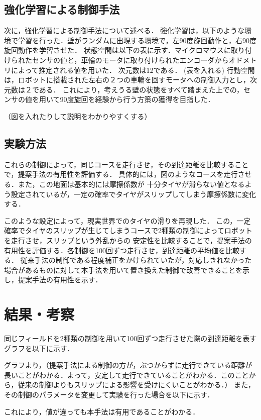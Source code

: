 \documentclass[a4paper,11pt]{jsarticle}
\begin{document}
\subsection{強化学習による制御手法}
次に，強化学習による制御手法について述べる．
強化学習は，以下のような環境で学習を行った．壁がランダムに出現する環境で，左90度旋回動作と，右90度旋回動作を学習させた．
状態空間は以下の表に示す．マイクロマウスに取り付けられたセンサの値と，車輪のモータに取り付けられたエンコーダからオドメトリによって推定される値を用いた．
次元数は12である．
(表を入れる)
行動空間は，ロボットに搭載された左右の２つの車輪を回すモータへの制御入力とし，次元数は２である．
これにより，考えうる壁の状態をすべて踏まえた上での，センサの値を用いて90度旋回を経験から行う方策の獲得を目指した．

（図を入れたりして説明をわかりやすくする）
\subsection{実験方法}
これらの制御によって，同じコースを走行させ，その到達距離を比較することで，提案手法の有用性を評価する．
具体的には，図のようなコースを走行させる．また，この地面は基本的には摩擦係数が
十分タイヤが滑らない値となるよう設定されているが，一定の確率でタイヤがスリップしてしまう摩擦係数に変化する．

このような設定によって，現実世界でのタイヤの滑りを再現した．
この，一定確率でタイヤのスリップが生じてしまうコースで2種類の制御によってロボットを走行させ，スリップという外乱からの
安定性を比較することで，提案手法の有用性を評価する．各制御を100回ずつ走行させ，到達距離の平均値を比較する．
従来手法の制御である程度補正をかけられていたが，対応しきれなかった場合があるものに対して本手法を用いて置き換えた制御で改善できることを示し，提案手法の有用性を示す．
\section{結果・考察}
同じフィールドを2種類の制御を用いて100回ずつ走行させた際の到達距離を表すグラフを以下に示す．


グラフより，（提案手法による制御の方が，ぶつからずに走行できている距離が長いことがわかる．よって，安定して走行できていることがわかる．このことから，従来の制御よりもスリップによる影響を受けにくいことがわかる．）
また，その制御のパラメータを変更して実験を行った場合を以下に示す．

これにより，値が違っても本手法は有用であることがわかる．
\end{document}
